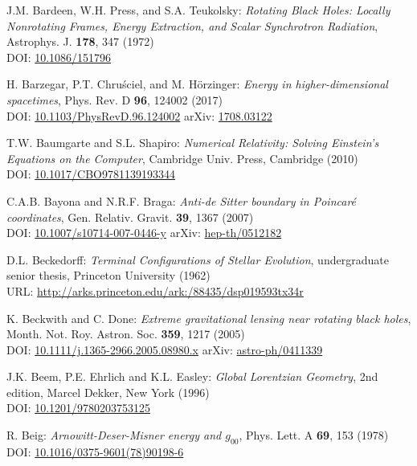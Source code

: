\begin{thebibliography}{123}
J.M. Bardeen, W.H. Press, and S.A. Teukolsky:
{\em Rotating Black Holes: Locally Nonrotating Frames, Energy Extraction, and Scalar Synchrotron Radiation},
Astrophys. J. {\bf  178}, 347 (1972)\\
DOI: \href{https://doi.org/10.1086/151796}{10.1086/151796}

H. Barzegar, P.T. Chruściel, and M. Hörzinger:
{\em Energy in higher-dimensional spacetimes},
Phys. Rev. D {\bf 96}, 124002 (2017)\\
DOI: \href{https://doi.org/10.1103/PhysRevD.96.124002}{10.1103/PhysRevD.96.124002}\hfill
arXiv: \href{https://arxiv.org/abs/1708.03122}{1708.03122}

T.W. Baumgarte and S.L. Shapiro:
{\em Numerical Relativity: Solving Einstein's Equations on the Computer},
Cambridge Univ. Press, Cambridge (2010)\\
DOI: \href{https://doi.org/10.1017/CBO9781139193344}{10.1017/CBO9781139193344}

C.A.B. Bayona and N.R.F. Braga:
{\em Anti-de Sitter boundary in Poincaré coordinates},
Gen. Relativ. Gravit. {\bf 39}, 1367 (2007)\\
DOI: \href{https://doi.org/10.1007/s10714-007-0446-y}{10.1007/s10714-007-0446-y}\hfill
arXiv: \href{https://arxiv.org/abs/hep-th/0512182}{hep-th/0512182}

D.L. Beckedorff:
{\em Terminal Configurations of Stellar Evolution},
undergraduate senior thesis, Princeton University (1962)\\
URL: \url{http://arks.princeton.edu/ark:/88435/dsp019593tx34r}

K. Beckwith and C. Done:
{\em Extreme gravitational lensing near rotating black holes},
Month. Not. Roy. Astron. Soc. {\bf 359}, 1217 (2005)\\
DOI: \href{https://doi.org/10.1111/j.1365-2966.2005.08980.x}{10.1111/j.1365-2966.2005.08980.x}\hfill
arXiv: \href{https://arxiv.org/abs/astro-ph/0411339}{astro-ph/0411339}

J.K. Beem, P.E. Ehrlich and K.L. Easley:
{\em Global Lorentzian Geometry}, 2nd edition,
Marcel Dekker, New York (1996)\\
DOI: \href{https://doi.org/10.1201/9780203753125}{10.1201/9780203753125}

R. Beig:
{\em Arnowitt-Deser-Misner energy and $g_{00}$},
Phys. Lett. A {\bf 69}, 153 (1978)\\
DOI: \href{https://doi.org/10.1016/0375-9601(78)90198-6}{10.1016/0375-9601(78)90198-6}


\end{thebibliography}
